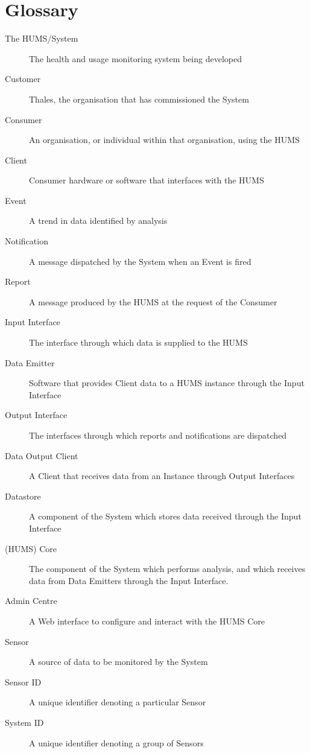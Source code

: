 \documentclass[10pt,a4paper]{article}
\begin{document}
\section{Glossary}
\label{sec:glossary}
\begin{description}%
	\item[The HUMS/System] The health and usage monitoring system being developed
	
	\vspace{0.15cm}
	\item[Customer] Thales, the organisation that has commissioned the System
	\item[Consumer] An organisation, or individual within that organisation, using the HUMS
	\item[Client] Consumer hardware or software that interfaces with the HUMS
	
	\vspace{0.15cm}
	\item[Event] A trend in data identified by analysis
	\item[Notification] A message dispatched by the System when an Event is fired
	\item[Report] A message produced by the HUMS at the request of the Consumer
	
	\vspace{0.15cm}
	\item[Input Interface] The interface through which data is supplied to  the HUMS
	\item[Data Emitter] Software that provides Client data to a HUMS instance through the Input Interface
	\item[Output Interface] The interfaces through which reports and notifications are dispatched
	\item[Data Output Client] A Client that receives data from an Instance through Output Interfaces
    \item[Datastore] A component of the System which stores data received through the Input Interface
    \item[(HUMS) Core] The component of the System which performs analysis, and which receives data from Data Emitters through the Input Interface.
	\item[Admin Centre] A Web interface to configure and interact with the HUMS Core

	\vspace{0.15cm}
	\item[Sensor] A source of data to be monitored by the System
	\item[Sensor ID] A unique identifier denoting a particular Sensor
	\item[System ID] A unique identifier denoting a group of Sensors
\end{description}
\end{document}
